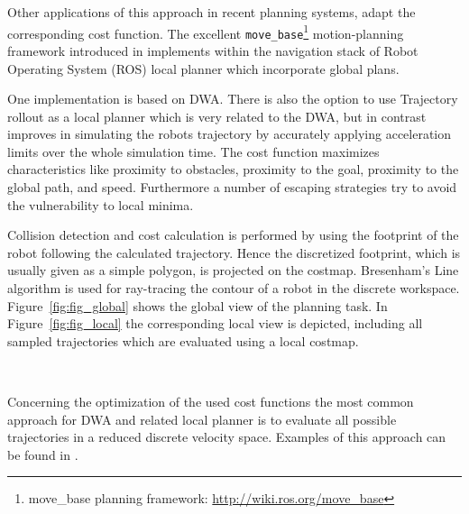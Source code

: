 Other applications of this approach in recent planning systems, adapt the corresponding cost function. 
The excellent \texttt{move\_base}\footnote{move\_base planning framework: \url{http://wiki.ros.org/move_base}} motion-planning framework introduced in \cite{DBLP:conf/icra/Marder-EppsteinBFGK10} implements within the navigation stack of Robot Operating System (ROS) local planner which incorporate global plans.

One implementation is based on DWA.
There is also the option to use Trajectory rollout \cite{gerkey08planning} as a local planner which is very related to the DWA, but in contrast improves in simulating the robots trajectory by accurately applying acceleration limits over the whole simulation time.
The cost function maximizes characteristics like proximity to obstacles, proximity to the goal, proximity to the global path, and speed.
Furthermore a number of escaping strategies try to avoid the vulnerability to local minima. 

Collision detection and cost calculation is performed by using the footprint of the robot following the calculated trajectory.
Hence the discretized footprint, which is usually given as a simple polygon, is projected on the costmap. 
Bresenham's Line algorithm \cite{bresenham1965algorithm} is used for ray-tracing the contour of a robot in the discrete workspace. 
Figure~\ref{fig:fig_global} shows the global view of the planning task. 
In Figure~\ref{fig:fig_local} the corresponding local view is depicted, including all sampled trajectories which are evaluated using a local costmap.

\begin{figure}[thpb]
	  \myfloatalign
      \footnotesize
      \centering
     \\    
   \caption[]{}
   \label{fig:fig_overview}
\end{figure}

Concerning the optimization of the used cost functions the most common approach for DWA and related local planner is to evaluate all possible trajectories in a reduced discrete velocity space. 
Examples of this approach can be found in \cite{kiss2012advanced}\cite{DBLP:conf/icra/Marder-EppsteinBFGK10}\cite{conf/icra/SederP07}. 

